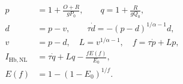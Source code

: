 \documentclass{article}
\begin{document}
\fontsize{22}{29}\selectfont
\[
\begin{aligned}p&=1+\frac{O+R}{gP_0},\qquad q=1+\frac{R}{gQ_0},\\d&=p-v,\qquad\tau\dot d=-(p-d)^{1/\alpha-1}d,\\v&=p-d,\quad L=v^{1/\alpha-1},\quad f=\tau\dot p+Lp,\\I_{\mathrm{Hb,NL}}&=\tau\dot q+Lq-\frac{fE(f)}{E_0},\\E(f)&=1-(1-E_0)^{1/f}.\end{aligned}
\]
\end{document}
